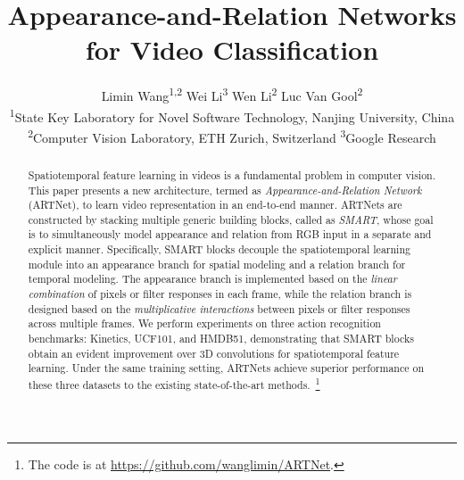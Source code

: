 \documentclass[10pt,twocolumn,letterpaper]{article}
\begin{document}
\title{Appearance-and-Relation Networks for Video Classification}


\author{Limin Wang\textsuperscript{1,2} \quad \quad Wei Li\textsuperscript{3} \quad \quad Wen Li\textsuperscript{2} \quad \quad Luc Van Gool\textsuperscript{2} \\
\textsuperscript{1}State Key Laboratory for Novel Software Technology, Nanjing University, China \\
\textsuperscript{2}Computer Vision Laboratory, ETH Zurich, Switzerland  \quad \quad \textsuperscript{3}Google Research \\
}
\maketitle


\begin{abstract}
Spatiotemporal feature learning in videos is a fundamental problem in computer vision. This paper presents a new architecture, termed as {\em Appearance-and-Relation Network} (ARTNet), to learn video representation in an end-to-end manner. ARTNets are constructed by stacking multiple generic building blocks, called as {\em SMART}, whose goal is to simultaneously model appearance and relation from RGB input in a separate and explicit manner. Specifically, SMART blocks decouple the spatiotemporal learning module into an appearance branch for spatial modeling and a relation branch for temporal modeling. The appearance branch is implemented based on the {\em linear combination} of pixels or filter responses in each frame, while the relation branch is designed based on the {\em multiplicative interactions} between pixels or filter responses across multiple frames. We perform experiments on three action recognition benchmarks: Kinetics, UCF101, and HMDB51, demonstrating that SMART blocks obtain an evident improvement over 3D convolutions for spatiotemporal feature learning. Under the same training setting, ARTNets achieve superior performance on these three datasets to the existing state-of-the-art methods.~\footnote{The code is at \url{https://github.com/wanglimin/ARTNet}.} 
\end{abstract}
\end{document}
